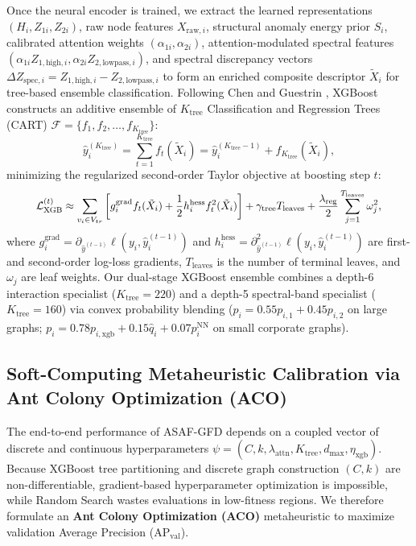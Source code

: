 \documentclass[10pt,a4paper,twocolumn]{article}
\begin{document}
Once the neural encoder is trained, we extract the learned representations $(H_i, Z_{1i}, Z_{2i})$, raw node features $X_{\text{raw},i}$, structural anomaly energy prior $S_i$, calibrated attention weights $(\alpha_{1i}, \alpha_{2i})$, attention-modulated spectral features $(\alpha_{1i} Z_{1,\text{high},i}, \alpha_{2i} Z_{2,\text{lowpass},i})$, and spectral discrepancy vectors $\Delta Z_{\text{spec},i} = Z_{1,\text{high},i} - Z_{2,\text{lowpass},i}$ to form an enriched composite descriptor $\tilde{X}_i$ for tree-based ensemble classification. Following Chen and Guestrin \cite{ref39}, XGBoost constructs an additive ensemble of $K_{\text{tree}}$ Classification and Regression Trees (CART) $\mathscr{F} = \{f_1, f_2, \dots, f_{K_{\text{tree}}}\}$:
\begin{equation}
  \hat{y}_i^{(K_{\text{tree}})} = \sum_{t=1}^{K_{\text{tree}}} f_t(\tilde{X}_i) = \hat{y}_i^{(K_{\text{tree}}-1)} + f_{K_{\text{tree}}}(\tilde{X}_i),
\end{equation}
minimizing the regularized second-order Taylor objective at boosting step $t$:
\begin{equation}
  \resizebox{0.89\linewidth}{!}{$\displaystyle \mathcal{L}_{\text{XGB}}^{(t)} \approx \sum_{v_i \in V_{tr}} \left[g_i^{\text{grad}} f_t(\tilde{X}_i) + \frac{1}{2} h_i^{\text{hess}} f_t^2(\tilde{X}_i)\right] + \gamma_{\text{tree}} T_{\text{leaves}} + \frac{\lambda_{\text{reg}}}{2} \sum_{j=1}^{T_{\text{leaves}}} \omega_j^2,$}
\end{equation}
where $g_i^{\text{grad}} = \partial_{\hat{y}^{(t-1)}} \ell(y_i, \hat{y}_i^{(t-1)})$ and $h_i^{\text{hess}} = \partial_{\hat{y}^{(t-1)}}^2 \ell(y_i, \hat{y}_i^{(t-1)})$ are first- and second-order log-loss gradients, $T_{\text{leaves}}$ is the number of terminal leaves, and $\omega_j$ are leaf weights. Our dual-stage XGBoost ensemble combines a depth-6 interaction specialist ($K_{\text{tree}} = 220$) and a depth-5 spectral-band specialist ($K_{\text{tree}} = 160$) via convex probability blending ($p_i = 0.55 p_{i,1} + 0.45 p_{i,2}$ on large graphs; $p_i = 0.78 p_{i,\text{xgb}} + 0.15 \hat{q}_i + 0.07 p_i^{\text{NN}}$ on small corporate graphs).

\subsection{Soft-Computing Metaheuristic Calibration via Ant Colony Optimization (ACO)}

The end-to-end performance of ASAF-GFD depends on a coupled vector of discrete and continuous hyperparameters $\psi = (C, k, \lambda_{\text{attn}}, K_{\text{tree}}, d_{\max}, \eta_{\text{xgb}})$. Because XGBoost tree partitioning and discrete graph construction $(C, k)$ are non-differentiable, gradient-based hyperparameter optimization is impossible, while Random Search \cite{ref9} wastes evaluations in low-fitness regions. We therefore formulate an \textbf{Ant Colony Optimization (ACO)} metaheuristic \cite{ref57} to maximize validation Average Precision ($\text{AP}_{\text{val}}$).
\end{document}
